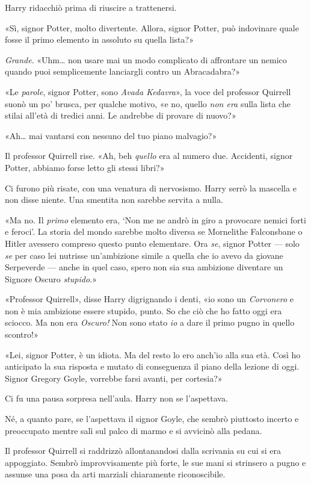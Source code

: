 Harry ridacchiò prima di riuscire a trattenersi.

«Sì, signor Potter, molto divertente. Allora, signor Potter, può indovinare quale fosse il primo elemento in assoluto su quella lista?»

\textit{Grande}. «Uhm… non usare mai un modo complicato di affrontare un nemico quando puoi semplicemente lanciargli contro un Abracadabra?»

«Le \textit{parole}, signor Potter, sono \textit{Avada Kedavra}», la voce del professor Quirrell suonò un po’ brusca, per qualche motivo, «e no, quello \textit{non era} sulla lista che stilai all’età di tredici anni. Le andrebbe di provare di nuovo?»

«Ah… mai vantarsi con nessuno del tuo piano malvagio?»

Il professor Quirrell rise. «Ah, beh \textit{quello} era al numero due. Accidenti, signor Potter, abbiamo forse letto gli stessi libri?»

Ci furono più risate, con una venatura di nervosismo. Harry serrò la mascella e non disse niente. Una smentita non sarebbe servita a nulla.

«Ma no. Il \textit{primo} elemento era, ‘Non me ne andrò in giro a provocare nemici forti e feroci’. La storia del mondo sarebbe molto diversa se Mornelithe Falconsbane o Hitler avessero compreso questo punto elementare. Ora \textit{se}, signor Potter — solo \textit{se} per caso lei nutrisse un’ambizione simile a quella che io avevo da giovane Serpeverde — anche in quel caso, spero non sia sua ambizione diventare un Signore Oscuro \textit{stupido.}»

«Professor Quirrell», disse Harry digrignando i denti, «io sono un \textit{Corvonero} e non è mia ambizione essere stupido, punto. So che ciò che ho fatto oggi era sciocco. Ma non era \textit{Oscuro!} Non sono stato \textit{io} a dare il primo pugno in quello scontro!»

«Lei, signor Potter, è un idiota. Ma del resto lo ero anch’io alla sua età. Così ho anticipato la sua risposta e mutato di conseguenza il piano della lezione di oggi. Signor Gregory Goyle, vorrebbe farsi avanti, per cortesia?»

Ci fu una pausa sorpresa nell’aula. Harry non se l’aspettava.

Né, a quanto pare, se l’aspettava il signor Goyle, che sembrò piuttosto incerto e preoccupato mentre salì sul palco di marmo e si avvicinò alla pedana.

Il professor Quirrell si raddrizzò allontanandosi dalla scrivania su cui si era appoggiato. Sembrò improvvisamente più forte, le sue mani si strinsero a pugno e assunse una posa da arti marziali chiaramente riconoscibile.

